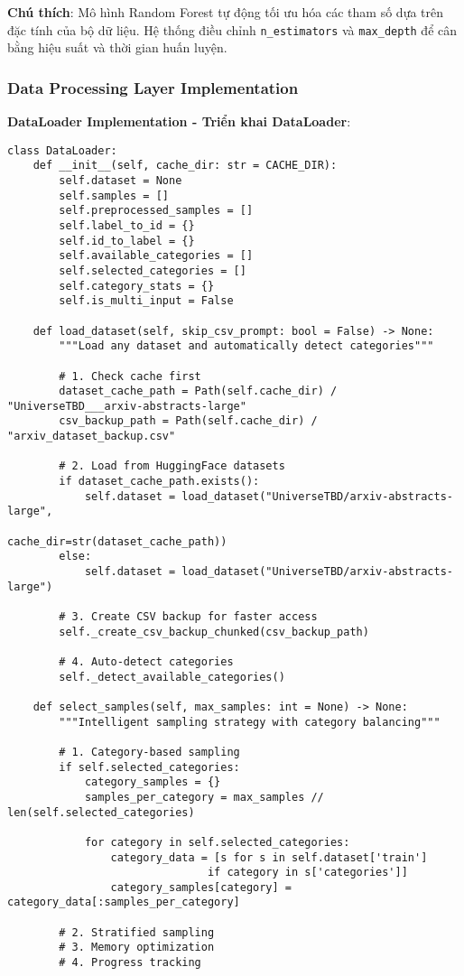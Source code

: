 \textbf{Chú thích}: Mô hình Random Forest tự động tối ưu hóa các tham số dựa trên đặc tính của bộ dữ liệu. Hệ thống điều chỉnh \texttt{n\_estimators} và \texttt{max\_depth} để cân bằng hiệu suất và thời gian huấn luyện.

\subsubsection{Data Processing Layer Implementation}

\textbf{DataLoader Implementation - Triển khai DataLoader}:

\begin{verbatim}
class DataLoader:
    def __init__(self, cache_dir: str = CACHE_DIR):
        self.dataset = None
        self.samples = []
        self.preprocessed_samples = []
        self.label_to_id = {}
        self.id_to_label = {}
        self.available_categories = []
        self.selected_categories = []
        self.category_stats = {}
        self.is_multi_input = False
        
    def load_dataset(self, skip_csv_prompt: bool = False) -> None:
        """Load any dataset and automatically detect categories"""
        
        # 1. Check cache first
        dataset_cache_path = Path(self.cache_dir) / "UniverseTBD___arxiv-abstracts-large"
        csv_backup_path = Path(self.cache_dir) / "arxiv_dataset_backup.csv"
        
        # 2. Load from HuggingFace datasets
        if dataset_cache_path.exists():
            self.dataset = load_dataset("UniverseTBD/arxiv-abstracts-large", 
                                       cache_dir=str(dataset_cache_path))
        else:
            self.dataset = load_dataset("UniverseTBD/arxiv-abstracts-large")
        
        # 3. Create CSV backup for faster access
        self._create_csv_backup_chunked(csv_backup_path)
        
        # 4. Auto-detect categories
        self._detect_available_categories()
        
    def select_samples(self, max_samples: int = None) -> None:
        """Intelligent sampling strategy with category balancing"""
        
        # 1. Category-based sampling
        if self.selected_categories:
            category_samples = {}
            samples_per_category = max_samples // len(self.selected_categories)
            
            for category in self.selected_categories:
                category_data = [s for s in self.dataset['train'] 
                               if category in s['categories']]
                category_samples[category] = category_data[:samples_per_category]
        
        # 2. Stratified sampling
        # 3. Memory optimization
        # 4. Progress tracking
\end{verbatim}

